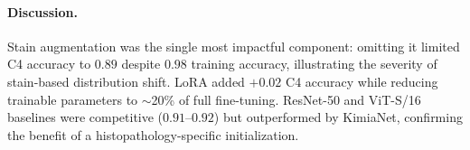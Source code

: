 \documentclass{midl}
\begin{document}
\paragraph{Discussion.}
Stain augmentation was the single most impactful component: omitting it limited C4 accuracy
to $0.89$ despite $0.98$ training accuracy, illustrating the severity of stain-based
distribution shift. LoRA added $+0.02$ C4 accuracy while reducing trainable parameters to
$\sim$20\% of full fine-tuning. ResNet-50 and ViT-S/16 baselines were competitive
($0.91$--$0.92$) but outperformed by KimiaNet, confirming the benefit of a
histopathology-specific initialization.

\clearpage

\end{document}

